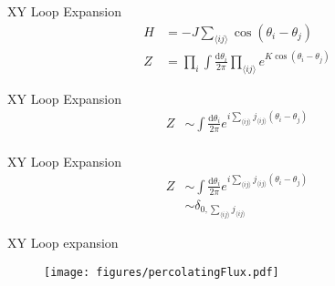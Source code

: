 \documentclass[10pt]{beamer}
\begin{document}
\begin{frame}{XY Loop Expansion}
    \begin{align*}
        H &= - J \sum_{\langle ij \rangle} \cos(\theta_i - \theta_j) \\
        Z &= \prod_i \int \frac{\mathrm d \theta_i}{2 \pi} \prod_{\langle ij \rangle} e^{K  \cos(\theta_i - \theta_j)}
    \end{align*}
\end{frame}

\begin{frame}{XY Loop Expansion}
    \begin{align*}
        Z &\sim \int \frac{\mathrm d \theta_i}{2 \pi} e^{i \sum_{\langle ij \rangle} j_{\langle ij \rangle} (\theta_i - \theta_j)} \\
    \end{align*}
\end{frame}

\begin{frame}{XY Loop Expansion}
    \begin{align*}
        Z &\sim \int \frac{\mathrm d \theta_i}{2 \pi} e^{i \sum_{\langle ij \rangle} j_{\langle ij \rangle} (\theta_i - \theta_j)} \\
        & \sim \delta_{0, \sum_{\langle ij \rangle} j_{\langle ij \rangle}}
    \end{align*}
\end{frame}

\begin{frame}{XY Loop expansion}
    \begin{figure}[h!]
        \centering
            \texttt{[image: figures/percolatingFlux.pdf]}
    \end{figure}
\end{frame}
\end{document}
